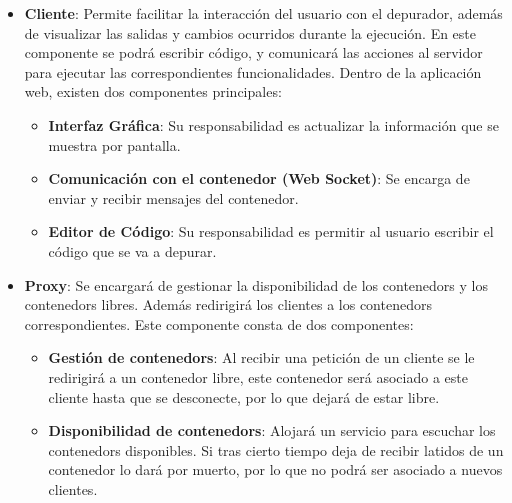 \begin{itemize}
    \item \textbf{Cliente}: Permite facilitar la interacción del usuario con el depurador, además de visualizar las salidas y cambios ocurridos durante la ejecución. En este componente se podrá escribir código, y comunicará las acciones al servidor para ejecutar las correspondientes funcionalidades. 
    Dentro de la aplicación web, existen dos componentes principales:

    \begin{itemize}
        \item \textbf{Interfaz Gráfica}: Su responsabilidad es actualizar la información que se muestra por pantalla.
        \item \textbf{Comunicación con el contenedor (Web Socket)}: Se encarga de enviar y recibir mensajes del contenedor.
        \item \textbf{Editor de Código}: Su responsabilidad es permitir al usuario escribir el código que se va a depurar.
    \end{itemize}

    \item \textbf{Proxy}: Se encargará de gestionar la disponibilidad de los \glspl{contenedor} y los \glspl{contenedor} libres. Además redirigirá los clientes a los \glspl{contenedor} correspondientes.
    Este componente consta de dos componentes:
    \begin{itemize}
        \item \textbf{Gestión de \glspl{contenedor}}: Al recibir una petición de un cliente se le redirigirá a un contenedor libre, este contenedor será asociado a este cliente hasta que se desconecte, por lo que dejará de estar libre.
        \item \textbf{Disponibilidad de \glspl{contenedor}}: Alojará un servicio para escuchar los \glspl{contenedor} disponibles. Si tras cierto tiempo deja de recibir latidos de un contenedor lo dará por muerto, por lo que no podrá ser asociado a nuevos clientes.  
    \end{itemize}


\end{itemize}
